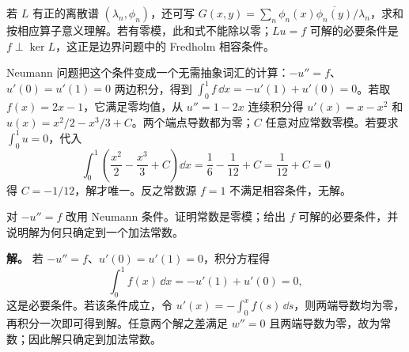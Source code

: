 若 \(L\) 有正的离散谱 \((\lambda_n,\phi_n)\)，还可写 \(G(x,y)=\sum_n\phi_n(x)\overline{\phi_n(y)}/\lambda_n\)，求和按相应算子意义理解。若有零模，此和式不能除以零；\(Lu=f\) 可解的必要条件是 \(f\perp\ker L\)，这正是边界问题中的 Fredholm 相容条件。

Neumann 问题把这个条件变成一个无需抽象词汇的计算：\(-u''=f\)、\(u'(0)=u'(1)=0\) 两边积分，得到 \(\int_0^1f\,\dd x=-u'(1)+u'(0)=0\)。若取 \(f(x)=2x-1\)，它满足零均值，从 \(u''=1-2x\) 连续积分得 \(u'(x)=x-x^2\) 和 \(u(x)=x^2/2-x^3/3+C\)。两个端点导数都为零；\(C\) 任意对应常数零模。若要求 \(\int_0^1u=0\)，代入
\[
\int_0^1\left(\frac{x^2}{2}-\frac{x^3}{3}+C\right)\dd x
=\frac16-\frac1{12}+C=\frac1{12}+C=0
\]
得 \(C=-1/12\)，解才唯一。反之常数源 \(f=1\) 不满足相容条件，无解。



\par
\begin{workedexample}
对 \(-u''=f\) 改用 Neumann 条件。证明常数是零模；给出 \(f\) 可解的必要条件，并说明解为何只确定到一个加法常数。


\textbf{解。} 若 \(-u''=f\)、\(u'(0)=u'(1)=0\)，积分方程得
\[
\int_0^1 f(x)\,\dd x=-u'(1)+u'(0)=0,
\]
这是必要条件。若该条件成立，令 \(u'(x)=-\int_0^x f(s)\,\dd s\)，则两端导数均为零，再积分一次即可得到解。任意两个解之差满足 \(w''=0\) 且两端导数为零，故为常数；因此解只确定到加法常数。
\end{workedexample}
\par
